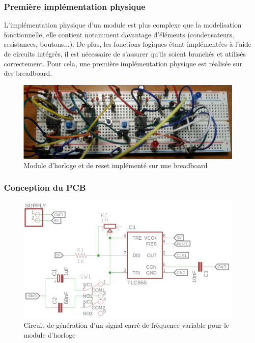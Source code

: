 \documentclass{article}
\begin{document}
    \subsubsection{Première implémentation physique}

    L'implémentation physique d'un module est plus complexe que la modelisation fonctionnelle, elle 
    contient notamment davantage d'éléments (condensateurs, resistances, boutons...).
    De plus, les fonctions logiques étant implémentées à l'aide de circuits intégrés, il est nécessaire 
    de s'assurer qu'ils soient branchés et utilisés correctement. Pour cela, une première implémentation 
    physique est réalisée sur des breadboard.

    \begin{figure}[ht!]
        \label{fig_CLK_breadboard}
        \centering
        \includegraphics[width=\textwidth]{figures/CLK_breadboard.jpg}
        \caption{Module d'horloge et de reset implémenté sur une breadboard}
    \end{figure}

    \subsubsection{Conception du PCB}

    \begin{figure}[ht!]
        \label{fig_CLK_eagle}
        \centering
        \includegraphics[width=\textwidth]{figures/CLK_eagle.png}
        \caption{Circuit de génération d'un signal carré de fréquence variable pour le module d'horloge}
    \end{figure}
\end{document}
